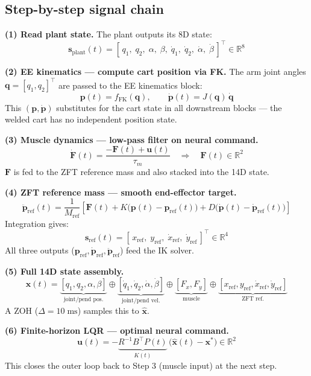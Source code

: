 \documentclass[11pt, a4paper]{article}
\begin{document}
\subsection*{Step-by-step signal chain}

\bigskip
\noindent\textbf{(1) Read plant state.}
The plant outputs its 8D state:
\[
\bm{s}_{\mathrm{plant}}(t)
= [\,q_1,\;q_2,\;\alpha,\;\beta,\;\dot{q}_1,\;\dot{q}_2,\;\dot{\alpha},\;\dot{\beta}\,]^{\!\top}
\in\mathbb{R}^{8}
\]

\bigskip
\noindent\textbf{(2) EE kinematics — compute cart position via FK.}
The arm joint angles $\bm{q} = [q_1, q_2]^{\top}$ are passed to the EE
kinematics block:
\[
\bm{p}(t) = f_{\mathrm{FK}}(\bm{q}),
\qquad
\dot{\bm{p}}(t) = J(\bm{q})\,\dot{\bm{q}}
\]
This $(\bm{p}, \dot{\bm{p}})$ substitutes for the cart state in all downstream
blocks — the welded cart has no independent position state.

\bigskip
\noindent\textbf{(3) Muscle dynamics — low-pass filter on neural command.}
\[
\dot{\bm{F}}(t) = \frac{-\bm{F}(t) + \bm{u}(t)}{\tau_m}
\quad\Longrightarrow\quad
\bm{F}(t) \in\mathbb{R}^{2}
\]
$\bm{F}$ is fed to the ZFT reference mass and also stacked into the 14D state.

\bigskip
\noindent\textbf{(4) ZFT reference mass — smooth end-effector target.}
\[
\ddot{\bm{p}}_{\mathrm{ref}}(t)
= \frac{1}{M_{\mathrm{ref}}}\!\left[
    \bm{F}(t)
    + K\bigl(\bm{p}(t) - \bm{p}_{\mathrm{ref}}(t)\bigr)
    + D\bigl(\dot{\bm{p}}(t) - \dot{\bm{p}}_{\mathrm{ref}}(t)\bigr)
  \right]
\]
Integration gives:
\[
\bm{s}_{\mathrm{ref}}(t)
= [\,x_{\mathrm{ref}},\;y_{\mathrm{ref}},\;\dot{x}_{\mathrm{ref}},\;\dot{y}_{\mathrm{ref}}\,]^{\!\top}
\in\mathbb{R}^{4}
\]
All three outputs ($\bm{p}_{\mathrm{ref}},\dot{\bm{p}}_{\mathrm{ref}},
\ddot{\bm{p}}_{\mathrm{ref}}$) feed the IK solver.

\bigskip
\noindent\textbf{(5) Full 14D state assembly.}
\[
\bm{x}(t) =
\underbrace{[q_1, q_2, \alpha, \beta]}_{\text{joint/pend pos.}}
\oplus
\underbrace{[\dot{q}_1, \dot{q}_2, \dot{\alpha}, \dot{\beta}]}_{\text{joint/pend vel.}}
\oplus
\underbrace{[F_x, F_y]}_{\text{muscle}}
\oplus
\underbrace{[x_{\mathrm{ref}}, y_{\mathrm{ref}}, \dot{x}_{\mathrm{ref}}, \dot{y}_{\mathrm{ref}}]}_{\text{ZFT ref.}}
\]
A ZOH ($\Delta = 10\;\mathrm{ms}$) samples this to $\hat{\bm{x}}$.

\bigskip
\noindent\textbf{(6) Finite-horizon LQR — optimal neural command.}
\[
\bm{u}(t) = -\underbrace{R^{-1}B^{\!\top}P(t)}_{K(t)}\,\bigl(\hat{\bm{x}}(t) - \bm{x}^{*}\bigr)
\in\mathbb{R}^{2}
\]
This closes the outer loop back to Step 3 (muscle input) at the next step.
\end{document}
